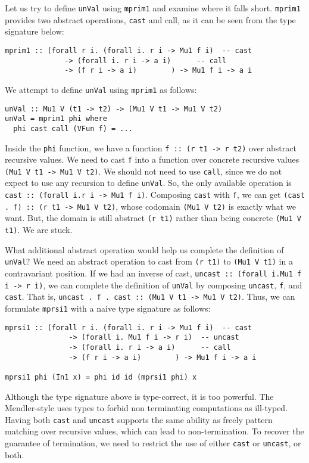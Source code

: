 Let us try to define \lstinline{unVal} using \lstinline{mprim1} and examine
where it falls short. \lstinline{mprim1} provides two abstract operations,
\lstinline{cast} and {call}, as it can be seen from the type signature below:
\begin{lstlisting}
mprim1 :: (forall r i. (forall i. r i -> Mu1 f i)  -- cast
              -> (forall i. r i -> a i)      -- call
              -> (f r i -> a i)        ) -> Mu1 f i -> a i
\end{lstlisting}
We attempt to define \lstinline{unVal} using \lstinline{mprim1} as follows:
\begin{lstlisting}
unVal :: Mu1 V (t1 -> t2) -> (Mu1 V t1 -> Mu1 V t2)
unVal = mprim1 phi where
  phi cast call (VFun f) = ...
\end{lstlisting}
Inside the \lstinline{phi} function, we have a function
\lstinline{f :: (r t1 -> r t2)} over abstract recursive values.
We need to cast \lstinline{f} into a function over concrete recursive values
\lstinline{(Mu1 V t1 -> Mu1 V t2)}.
We should not need to use \lstinline{call}, since we do not expect
to use any recursion to define \lstinline{unVal}.
So, the only available operation is
\lstinline{cast :: (forall i.r i -> Mu1 f i)}.
Composing \lstinline{cast} with \lstinline{f}, we can get
\lstinline{(cast . f) :: (r t1 -> Mu1 V t2)}, whose codomain
\lstinline{(Mu1 V t2)} is exactly what we want. But, the domain
is still abstract \lstinline{(r t1)} rather than being concrete
\lstinline{(Mu1 V t1)}. We are stuck.

What additional abstract operation would help us complete
the definition of \lstinline{unVal}? We need an abstract operation
to cast from \lstinline{(r t1)} to \lstinline{(Mu1 V t1)}
in a contravariant position. If we had an inverse of cast,
\lstinline{uncast :: (forall i.Mu1 f i -> r i)}, we can
complete the definition of \lstinline{unVal} by composing
\lstinline{uncast}, \lstinline{f}, and \lstinline{cast}.
That is, \lstinline{uncast . f . cast :: (Mu1 V t1 -> Mu1 V t2)}.
Thus, we can formulate \lstinline{mprsi1} with a naive type signature
as follows:
\begin{lstlisting}
mprsi1 :: (forall r i. (forall i. r i -> Mu1 f i)  -- cast
               -> (forall i. Mu1 f i -> r i)  -- uncast
               -> (forall i. r i -> a i)      -- call
               -> (f r i -> a i)        ) -> Mu1 f i -> a i

mprsi1 phi (In1 x) = phi id id (mprsi1 phi) x
\end{lstlisting}
Although the type signature above is type-correct, it is too powerful.
The Mendler-style uses types to forbid non terminating computations
as ill-typed. Having both \lstinline{cast} and \lstinline{uncast} supports
the same ability as freely pattern matching over recursive values,
which can lead to non-termination. To recover the guarantee of termination,
we need to restrict the use of either \lstinline{cast} or \lstinline{uncast},
or both.


